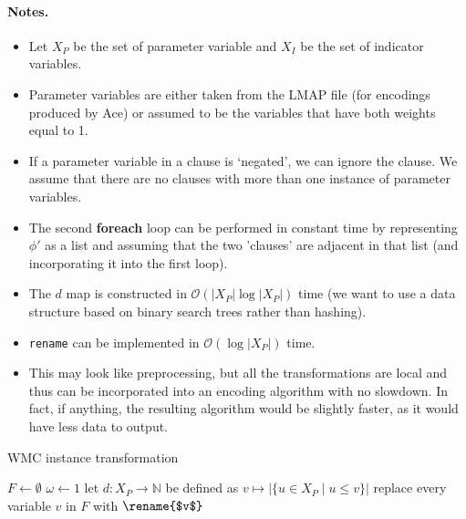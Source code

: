\documentclass{article}
\theoremstyle{definition}
\theoremstyle{remark}
\begin{document}
\paragraph{Notes.}
\begin{itemize}
\item Let $X_P$ be the set of parameter variable and $X_I$ be the set of
  indicator variables.
\item Parameter variables are either taken from the LMAP file (for encodings
  produced by Ace) or assumed to be the variables that have both weights equal
  to 1.
\item If a parameter variable in a clause is `negated', we can ignore the
  clause. We assume that there are no clauses with more than one instance of
  parameter variables.
\item The second \textbf{foreach} loop can be performed in constant time by
  representing $\phi'$ as a list and assuming that the two 'clauses' are
  adjacent in that list (and incorporating it into the first loop).
\item The $d$ map is constructed in $\mathcal{O}(|X_P|\log|X_P|)$ time (we want
  to use a data structure based on binary search trees rather than hashing).
\item \texttt{rename} can be implemented in $\mathcal{O}(\log |X_P|)$ time.
\item This may look like preprocessing, but all the transformations are local
  and thus can be incorporated into an encoding algorithm with no slowdown. In
  fact, if anything, the resulting algorithm would be slightly faster, as it
  would have less data to output.
\end{itemize}

\begin{algorithm}
  \caption{WMC instance transformation}
  $F \gets \emptyset$\;
  $\omega \gets 1$\;
  let $d\colon X_P \to \mathbb{N}$ be defined as $v \mapsto |\{ u \in X_P \mid u
  \le v \}|$\;
  replace every variable $v$ in $F$ with $\rename{$v$}$\;
  \;
\end{algorithm}
\end{document}
